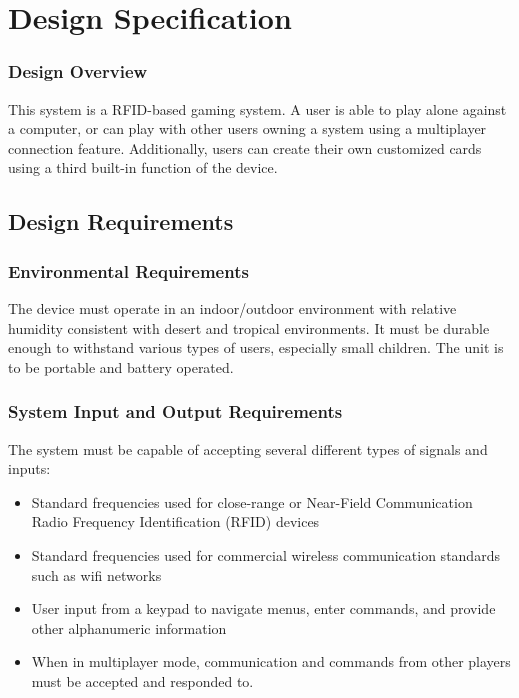 \documentclass[12pt]{article} %
\begin{document}
\section{Design Specification}\label{sec:designSpec} 

\subsubsection{Design Overview}
This system is a RFID-based gaming system. A user is able to play alone against a computer, or can play with other users owning a system using a multiplayer connection feature. Additionally, users can create their own customized cards using a third built-in function of the device.

\subsection{Design Requirements}\label{sec:requirements} %
\subsubsection{Environmental Requirements}

The device must operate in an indoor/outdoor environment with relative
humidity consistent with desert and tropical environments. It must be durable
enough to withstand various types of users, especially small children.  The
unit is to be portable and battery operated.

\subsubsection{System Input and Output Requirements}

The system must be capable of accepting several different types of signals and
inputs:

\begin{itemize}
	\item Standard frequencies used for close-range or Near-Field Communication
		Radio Frequency Identification (RFID) devices
	\item Standard frequencies used for commercial wireless communication
		standards such as wifi networks
	\item User input from a keypad to navigate menus, enter commands, and provide
		other alphanumeric information
	\item When in multiplayer mode, communication and commands from other players
		must be accepted and responded to.
\end{itemize}
\end{document}
